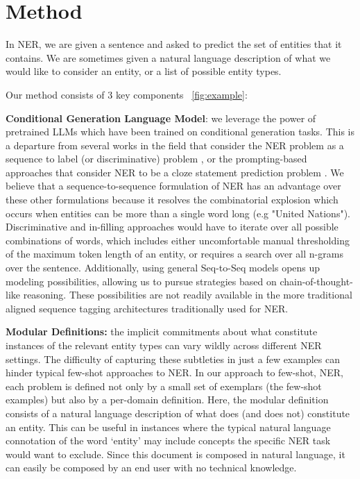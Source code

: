 \documentclass[11pt]{article}
\begin{document}
\section{Method}
In NER, we are given a sentence 
and asked to predict the set of entities that it contains. 
We are sometimes given a natural language description of what we would like to consider an entity, or a list of possible entity types. 


Our method consists of 3 key components ~\ref{fig:example}:

\textbf{Conditional Generation Language Model}:
we leverage the power of pretrained LLMs 
which have been trained on conditional generation tasks. 
This is a departure from several works in the field 
that consider the NER problem as a sequence to label (or discriminative) problem 
\citep{ali2022named, sharma2022named}, 
or the prompting-based approaches
that consider NER to be a cloze statement prediction problem \citep{cui2021template, lee2021good}.
We believe that a sequence-to-sequence formulation of NER 
has an advantage over these other formulations
because it resolves the combinatorial explosion 
which occurs when entities can be more than a single word long (e.g "United Nations"). 
Discriminative and in-filling approaches would have to iterate 
over all possible combinations of words,
which includes either uncomfortable manual thresholding of the maximum token length of an entity,
or requires a search over all n-grams over the sentence. 
Additionally, using general Seq-to-Seq models 
opens up modeling possibilities, allowing us 
to pursue strategies based on chain-of-thought-like reasoning.
These possibilities are not readily available in the more traditional
aligned sequence tagging architectures traditionally used for NER.



\textbf{Modular Definitions:} the implicit commitments
about what constitute instances of the relevant entity types
can vary wildly across different NER settings.
The difficulty of capturing these subtleties in just a few examples
can hinder typical few-shot approaches to NER.
In our approach to few-shot, NER, each problem is defined
not only by a small set of exemplars (the few-shot examples)
but also by a per-domain definition. 
Here, the modular definition consists of 
a natural language description of what does (and does not) constitute an entity.
This can be useful in instances where the typical natural language connotation
of the word `entity' may include concepts the specific NER task would want to exclude.
Since this document is composed in natural language,
it can easily be composed by an end user with no technical knowledge. 
\end{document}
